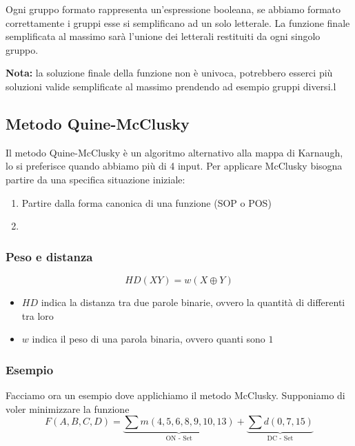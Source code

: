 \documentclass[../main.tex]{subfiles}
\begin{document}
Ogni gruppo formato rappresenta un'espressione booleana, se abbiamo formato correttamente i gruppi esse si semplificano ad un solo letterale.
La funzione finale semplificata al massimo sarà l'unione dei letterali restituiti da ogni singolo gruppo.

\textbf{Nota:} la soluzione finale della funzione non è univoca, potrebbero esserci più soluzioni valide semplificate al massimo prendendo
ad esempio gruppi diversi.l

\pagebreak
\subsection{Metodo Quine-McClusky}
Il metodo Quine-McClusky è un algoritmo alternativo alla mappa di Karnaugh, lo si preferisce quando abbiamo più di 4 input. 
Per applicare McClusky bisogna partire da una specifica situazione iniziale:
\begin{enumerate}
    \item Partire dalla forma canonica di una funzione (SOP o POS)
    \item 
\end{enumerate}

\subsubsection{Peso e distanza}
$$
    HD(XY) = w(X\oplus Y)
$$
\begin{itemize}
    \item $HD$ indica la distanza tra due parole binarie, ovvero la quantità di  differenti tra loro
    \item $w$ indica il peso di una parola binaria, ovvero quanti  sono $1$
\end{itemize}

\subsubsection{Esempio}
Facciamo ora un esempio dove applichiamo il metodo McClusky. Supponiamo di voler minimizzare la funzione
$$
    F(A,B,C,D) = \underbrace{\sum m(4,5,6,8,9,10,13)}_{\text{ON - Set}} + \underbrace{\sum d(0,7,15)}_{\text{DC - Set}}
$$
\end{document}

